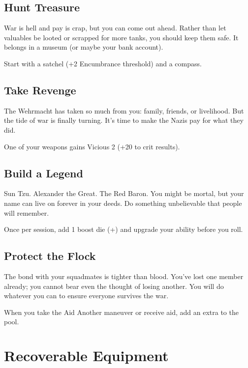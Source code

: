 \documentclass{book}
\newcommand{\bbb}{\BoostDie }
\begin{document}
\begin{multicols}{2}
\subsection{Hunt Treasure}

War is hell and pay is crap, but you can come out ahead.  Rather than let valuables be looted or scrapped for more tanks, you should keep them safe.  It belongs in a museum (or maybe your bank account).

Start with a satchel (+2 Encumbrance threshold) and a compass.


\subsection{Take Revenge}

The Wehrmacht has taken so much from you: family, friends, or livelihood.  But the tide of war is finally turning.  It's time to make the Nazis pay for what they did.

One of your weapons gains Vicious 2 (+20 to crit results).

\subsection{Build a Legend}

Sun Tzu.  Alexander the Great.  The Red Baron.  You might be mortal, but your name can live on forever in your deeds.  Do something unbelievable that people will remember.

Once per session, add 1 boost die (+\bbb) and upgrade your ability before you roll.

\subsection{Protect the Flock}

The bond with your squadmates is tighter than blood.  You've lost one member already; you cannot bear even the thought of losing another.  You will do whatever you can to ensure everyone survives the war.

When you take the Aid Another maneuver or receive aid, add an extra \Advantage\Advantage to the pool.

\section{Recoverable Equipment}


\end{multicols}
\end{document}
